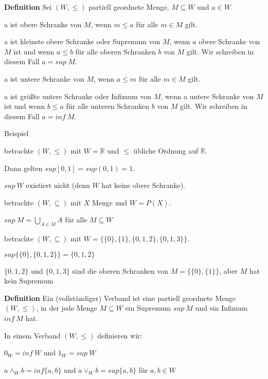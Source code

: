 \documentclass[a4paper]{article}
\renewcommand{\note}[2]{\begin{noteBox} \textbf{#1} #2 \end{noteBox}}
\begin{document}
\begin{multicols}{3}
  \note{Definition}{Sei $(W,\leq)$ partiell geordnete Menge, $M\subseteq W$ und $a\in W$.
    \begin{itemize*}
      \item a ist obere Schranke von $M$, wenn $m\leq a$ für alle $m\in M$ gilt.
      \item a ist kleinste obere Schranke oder Supremum von $M$, wenn $a$ obere Schranke von $M$ ist und wenn $a\leq b$ für alle oberen Schranken $b$ von $M$ gilt. Wir schreiben in diesem Fall $a=sup \ M$.
      \item a ist untere Schranke von $M$, wenn $a\leq m$ für alle $m\in M$ gilt.
      \item a ist größte untere Schranke oder Infimum von $M$, wenn a untere Schranke von $M$ ist und wenn $b\leq a$ für alle unteren Schranken $b$ von $M$ gilt. Wir schreiben in diesem Fall $a=inf\ M$.
    \end{itemize*}
  }

  Beispiel
  \begin{enumerate*}
    \item  betrachte $(W,\leq)$ mit $W=\mathbb{R}$ und $\leq$ übliche Ordnung auf $\mathbb{R}$.
    \begin{itemize*}
      \item Dann gelten $sup[0,1] = sup(0,1) =1$.
      \item $sup\ W$ existiert nicht (denn $W$ hat keine obere Schranke).
    \end{itemize*}
    \item betrachte $(W,\subseteq)$ mit $X$ Menge und $W =P(X)$.
    \begin{itemize*}
      \item $sup\ M=\bigcup_{A\in M} A$ für alle $M\subseteq W$
    \end{itemize*}
    \item betrachte $(W,\subseteq)$ mit $W=\{\{0\},\{1\},\{0,1,2\},\{0,1,3\}\}$.
    \begin{itemize*}
      \item $sup\{\{0\},\{0,1,2\}\}=\{0,1,2\}$
      \item $\{0,1,2\}$ und $\{0,1,3\}$ sind die oberen Schranken von $M=\{\{0\},\{1\}\}$, aber $M$ hat kein Supremum
    \end{itemize*}
  \end{enumerate*}

  \note{Definition}{ Ein (vollständiger) Verband ist eine partiell geordnete Menge $(W,\leq)$, in der jede Menge $M\subseteq W$ ein Supremum $sup\ M$ und ein Infimum $inf\ M$ hat.}
  In einem Verband $(W,\leq)$ definieren wir:
  \begin{itemize*}
    \item $0_W = inf\ W$ und $1_W= sup\ W$
    \item $a\wedge_W b= inf\{a,b\}$ und $a\vee_W b= sup\{a,b\}$ für $a,b\in W$
  \end{itemize*}


\end{multicols}
\end{document}
